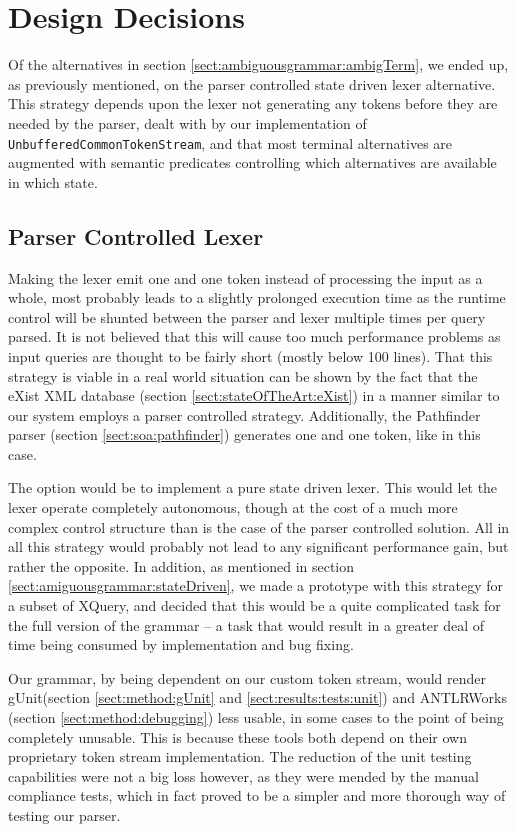 \section{Design Decisions}
\label{sect:discussion:designDecisions}

Of the alternatives in section \ref{sect:ambiguousgrammar:ambigTerm}, we ended up, as previously mentioned, on the parser controlled state driven lexer alternative. This strategy depends upon the lexer not generating any tokens before they are needed by the parser, dealt with by our implementation of \verb!UnbufferedCommonTokenStream!, and that most terminal alternatives are augmented with semantic predicates controlling which alternatives are available in which state.

\subsection{Parser Controlled Lexer}
Making the lexer emit one and one token instead of processing the input as a
whole, most probably leads to a slightly prolonged execution time as the
runtime control will be shunted between the parser and lexer multiple times
per query parsed. It is not believed that this will cause too much performance 
problems as input queries are thought to be fairly short (mostly below 100
lines). That this strategy is viable in a real world situation can be shown by
the fact that the eXist XML database (section \ref{sect:stateOfTheArt:eXist}) in
a manner similar to our system employs a parser controlled strategy.
Additionally, the Pathfinder parser (section \ref{sect:soa:pathfinder})
generates one and one token, like in this case.

The option would be to implement a pure state driven lexer. This would let the
lexer operate completely autonomous, though at the cost of a much more complex
control structure than is the case of the parser controlled solution. All in
all this strategy would probably not lead to any significant performance gain,
but rather the opposite. In addition, as mentioned in section
\ref{sect:amiguousgrammar:stateDriven}, we made a prototype with this strategy
for a subset of XQuery, and decided that this would be a quite complicated task
for the full version of the grammar -- a task that would result in a greater
deal of time being consumed by implementation and bug fixing.

Our grammar, by being dependent on our custom token stream, would render
gUnit(section \ref{sect:method:gUnit} and \ref{sect:results:tests:unit}) and
ANTLRWorks (section \ref{sect:method:debugging}) less usable, in some cases to
the point of being completely unusable. This is because these tools both depend
on their own proprietary token stream implementation. The reduction of the unit
testing capabilities were not a big loss however, as they were mended by the
manual compliance tests, which in fact proved to be a simpler and more thorough
way of testing our parser.

